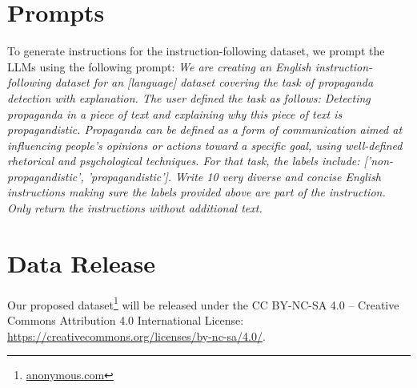 \section{Prompts}
\label{apndix:prompts}
To generate instructions for the instruction-following dataset, we prompt the LLMs using the following prompt: \textit{We are creating an English instruction-following dataset for an [language] dataset covering the task of propaganda detection with explanation. The user defined the task as follows: Detecting propaganda in a piece of text and explaining why this piece of text is propagandistic. Propaganda can be defined as a form of communication aimed at influencing people’s opinions or actions toward a specific goal, using well-defined rhetorical and psychological techniques. For that task, the labels include: ['non-propagandistic', 'propagandistic']. Write 10 very diverse and concise English instructions making sure the labels provided above are part of the instruction. Only return the instructions without additional text.}



\section{Data Release}
\label{apndix:release}
Our proposed dataset\footnote{\url{anonymous.com}} will be released under the CC BY-NC-SA 4.0 -- Creative Commons Attribution 4.0 International License: \url{https://creativecommons.org/licenses/by-nc-sa/4.0/}.
